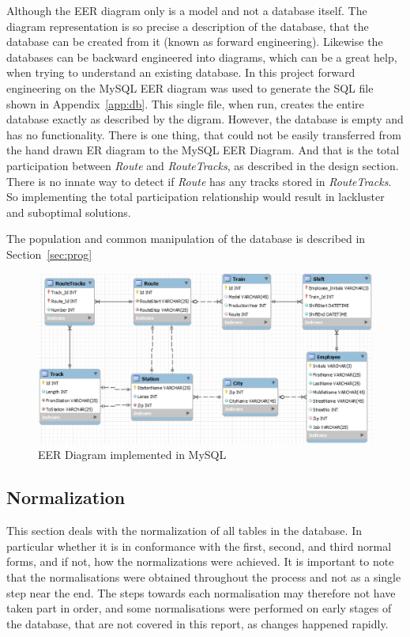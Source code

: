 Although the EER diagram only is a model and not a database itself. The diagram 
representation is so precise a description of the database, that the database 
can be created from it (known as forward engineering). Likewise the databases 
can be backward engineered into diagrams, which can be a great help, when 
trying to understand an existing database. In this project forward engineering 
on the MySQL EER diagram was used to generate the SQL file shown in 
Appendix~\ref{app:db}. This single file, when run, creates the entire database 
exactly as described by the digram. However, the database is empty and has no 
functionality. There is one thing, that could not be easily transferred from the hand drawn ER diagram to the MySQL EER Diagram. And that is the total participation between \emph{Route} and \emph{RouteTracks}, as described in the design section. There is no innate way to detect if \emph{Route} has any tracks stored in \emph{RouteTracks}. So implementing the total participation relationship would result in lackluster and suboptimal solutions.

The population and common manipulation of the database is 
described in Section~\ref{sec:prog}

\begin{figure}
    \centering
    \includegraphics[width=\textwidth]{img/EER.png}
    \caption{EER Diagram implemented in MySQL}
    \label{fig:EER}
\end{figure}

\subsection{Normalization}
This section deals with the normalization of all tables in the database. In 
particular whether it is in conformance with the first, second, and third 
normal forms, and if not, how the normalizations were achieved. It is important 
to note that the normalisations were obtained throughout the process and not as 
a single step near the end. The steps towards each normalisation may therefore 
not have taken part in order, and some normalisations were performed on early 
stages of the database, that are not covered in this report, as changes 
happened rapidly. 

